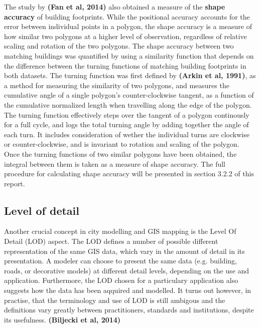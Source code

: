 \documentclass{kththesis}
\begin{document}
The study by \textbf{(Fan et al, 2014)} also obtained a measure of the \textbf{shape accuracy} of building footprints.
While the positional accuracy accounts for the error between individual points in a polygon, the shape accuracy is a measure of how similar two polygons at a higher level of observation, regardless of relative scaling and rotation of the two polygons.
The shape accuracy between two matching buildings was quantified by using a similarity function that depends on the difference between the turning functions of matching building footprints in both datasets.
The turning function was first defined by \textbf{(Arkin et al, 1991)}, as a method for measuring the similarity of two polygons, and measures the cumulative angle of a single polygon's counter-clockwise tangent, as a function of the cumulative normalized length when travelling along the edge of the polygon.
The turning function effectively steps over the tangent of a polygon continously for a full cycle, and logs the total turning angle by adding together the angle of each turn.
It includes consideration of wether the individual turns are clockwise or counter-clockwise, and is invariant to rotation and scaling of the polygon.
Once the turning functions of two similar polygons have been obtained, the integral between them is taken as a measure of shape accuracy.
The full procedure for calculating shape accuracy will be presented in section 3.2.2 of this report.

\subsection{Level of detail}

Another crucial concept in city modelling and GIS mapping is the Level Of Detail (LOD) aspect.
The LOD defines a number of possible different representation of the same GIS data, which vary in the amount of detail in its presentation.
A modeler can choose to present the same data (e.g. building, roads, or decorative models) at different detail levels, depending on the use and application.
Furthermore, the LOD chosen for a particulary application also suggests how the data has been aqquired and modelled.
It turns out however, in practise, that the terminology and use of LOD is still ambigous and the definitions vary greatly between practitioners, standards and institutions, despite its usefulness.
\textbf{(Biljecki et al, 2014)}
\end{document}
